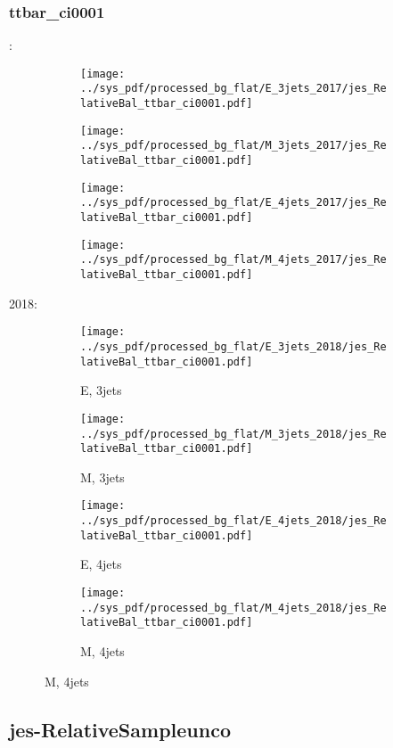 \documentclass{beamer}
\begin{document}
\begin{frame}
\frametitle{ttbar_ci0001}
\fontsize{5}{1}:
\begin{figure}
\centering
\begin{subfigure}[b]{0.24\textwidth}
\texttt{[image: ../sys\_pdf/processed\_bg\_flat/E\_3jets\_2017/jes\_RelativeBal\_ttbar\_ci0001.pdf]}
\end{subfigure}
\begin{subfigure}[b]{0.24\textwidth}
\texttt{[image: ../sys\_pdf/processed\_bg\_flat/M\_3jets\_2017/jes\_RelativeBal\_ttbar\_ci0001.pdf]}
\end{subfigure}
\begin{subfigure}[b]{0.24\textwidth}
\texttt{[image: ../sys\_pdf/processed\_bg\_flat/E\_4jets\_2017/jes\_RelativeBal\_ttbar\_ci0001.pdf]}
\end{subfigure}
\begin{subfigure}[b]{0.24\textwidth}
\texttt{[image: ../sys\_pdf/processed\_bg\_flat/M\_4jets\_2017/jes\_RelativeBal\_ttbar\_ci0001.pdf]}
\end{subfigure}
\end{figure}
2018:
\begin{figure}
\centering
\begin{subfigure}[b]{0.24\textwidth}
\texttt{[image: ../sys\_pdf/processed\_bg\_flat/E\_3jets\_2018/jes\_RelativeBal\_ttbar\_ci0001.pdf]}
\captionsetup{font=tiny}
\caption{E, 3jets}
\end{subfigure}
\begin{subfigure}[b]{0.24\textwidth}
\texttt{[image: ../sys\_pdf/processed\_bg\_flat/M\_3jets\_2018/jes\_RelativeBal\_ttbar\_ci0001.pdf]}
\captionsetup{font=tiny}
\caption{M, 3jets}
\end{subfigure}
\begin{subfigure}[b]{0.24\textwidth}
\texttt{[image: ../sys\_pdf/processed\_bg\_flat/E\_4jets\_2018/jes\_RelativeBal\_ttbar\_ci0001.pdf]}
\captionsetup{font=tiny}
\caption{E, 4jets}
\end{subfigure}
\begin{subfigure}[b]{0.24\textwidth}
\texttt{[image: ../sys\_pdf/processed\_bg\_flat/M\_4jets\_2018/jes\_RelativeBal\_ttbar\_ci0001.pdf]}
\captionsetup{font=tiny}
\caption{M, 4jets}
\end{subfigure}
\end{figure}
\end{frame}


\subsection{jes-RelativeSampleunco}
\end{document}

